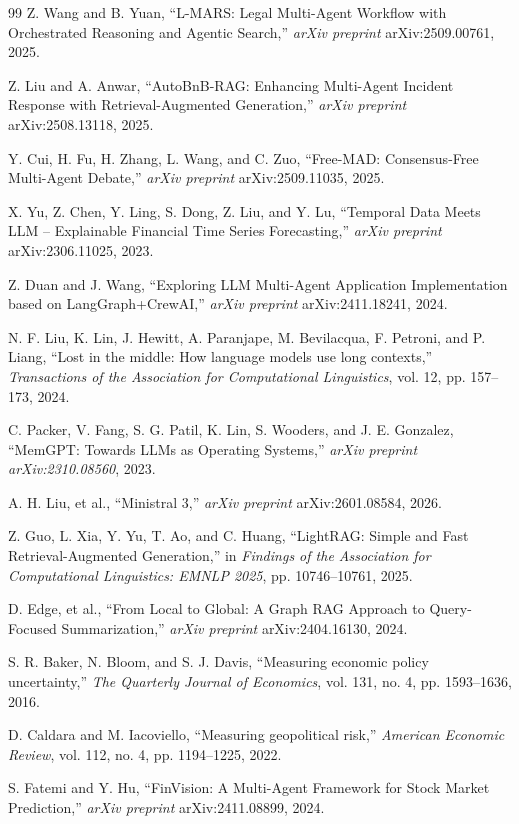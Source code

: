 \begin{thebibliography}{99}
Z. Wang and B. Yuan,
``L-MARS: Legal Multi-Agent Workflow with Orchestrated Reasoning and Agentic Search,''
\emph{arXiv preprint} arXiv:2509.00761, 2025.

Z. Liu and A. Anwar,
``AutoBnB-RAG: Enhancing Multi-Agent Incident Response with Retrieval-Augmented Generation,''
\emph{arXiv preprint} arXiv:2508.13118, 2025.

Y. Cui, H. Fu, H. Zhang, L. Wang, and C. Zuo,
``Free-MAD: Consensus-Free Multi-Agent Debate,''
\emph{arXiv preprint} arXiv:2509.11035, 2025.

X. Yu, Z. Chen, Y. Ling, S. Dong, Z. Liu, and Y. Lu,
``Temporal Data Meets LLM -- Explainable Financial Time Series Forecasting,''
\emph{arXiv preprint} arXiv:2306.11025, 2023.

Z. Duan and J. Wang,
``Exploring LLM Multi-Agent Application Implementation based on LangGraph+CrewAI,''
\emph{arXiv preprint} arXiv:2411.18241, 2024.

N. F. Liu, K. Lin, J. Hewitt, A. Paranjape, M. Bevilacqua, F. Petroni, and P. Liang,
``Lost in the middle: How language models use long contexts,''
\emph{Transactions of the Association for Computational Linguistics}, vol. 12, pp. 157--173, 2024.

C. Packer, V. Fang, S. G. Patil, K. Lin, S. Wooders, and J. E. Gonzalez,
``MemGPT: Towards LLMs as Operating Systems,''
\emph{arXiv preprint arXiv:2310.08560}, 2023.

A. H. Liu, et al.,
``Ministral 3,''
\emph{arXiv preprint} arXiv:2601.08584, 2026.

Z. Guo, L. Xia, Y. Yu, T. Ao, and C. Huang,
``LightRAG: Simple and Fast Retrieval-Augmented Generation,''
in \emph{Findings of the Association for Computational Linguistics: EMNLP 2025},
pp. 10746--10761, 2025.

D. Edge, et al.,
``From Local to Global: A Graph RAG Approach to Query-Focused Summarization,''
\emph{arXiv preprint} arXiv:2404.16130, 2024.

S. R. Baker, N. Bloom, and S. J. Davis,
``Measuring economic policy uncertainty,''
\emph{The Quarterly Journal of Economics}, vol. 131, no. 4, pp. 1593--1636, 2016.

D. Caldara and M. Iacoviello,
``Measuring geopolitical risk,''
\emph{American Economic Review}, vol. 112, no. 4, pp. 1194--1225, 2022.

S. Fatemi and Y. Hu,
``FinVision: A Multi-Agent Framework for Stock Market Prediction,''
\emph{arXiv preprint} arXiv:2411.08899, 2024.

\end{thebibliography}